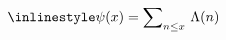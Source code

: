 \documentclass{article}
\begin{document}
\[
\color[rgb]{0.000,0.000,0.000} {
\inlinestyle\psi(x)=\sum\nolimits_{n\le x}\,\Lambda(n)}
\]
\end{document}
